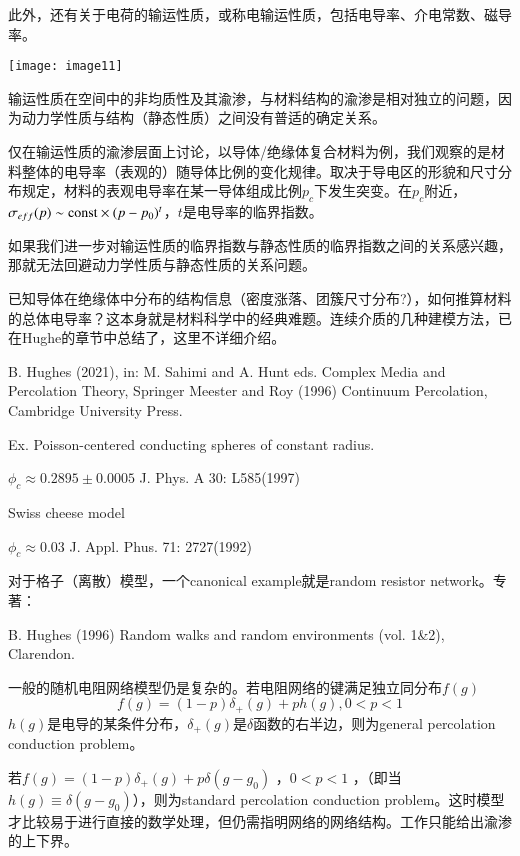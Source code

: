 \documentclass{article} %
\begin{document}
此外，还有关于电荷的输运性质，或称电输运性质，包括电导率、介电常数、磁导率。

\noindent \texttt{[image: image11]}

输运性质在空间中的非均质性及其渝渗，与材料结构的渝渗是相对独立的问题，因为动力学性质与结构（静态性质）之间没有普适的确定关系。

仅在输运性质的渝渗层面上讨论，以导体/绝缘体复合材料为例，我们观察的是材料整体的电导率（表观的）随导体比例的变化规律。取决于导电区的形貌和尺寸分布规定，材料的表观电导率在某一导体组成比例$p_{c} $下发生突变。在$p_{c} $附近，$\sigma _{eff} (p)\sim {\rm const}\times (p-p_{0} )^{t} $，$t$是电导率的临界指数。

如果我们进一步对输运性质的临界指数与静态性质的临界指数之间的关系感兴趣，那就无法回避动力学性质与静态性质的关系问题。

已知导体在绝缘体中分布的结构信息（密度涨落、团簇尺寸分布?），如何推算材料的总体电导率？这本身就是材料科学中的经典难题。连续介质的几种建模方法，已在Hughe的章节中总结了，这里不详细介绍。

\noindent B. Hughes (2021), in: M. Sahimi and A. Hunt eds. Complex Media and Percolation Theory, Springer Meester and Roy (1996) Continuum Percolation, Cambridge University Press.

\noindent Ex. Poisson-centered conducting spheres of constant radius.

\noindent $\phi _{c} \approx 0.2895\pm 0.0005$ J. Phys. A 30: L585(1997)

\noindent Swiss cheese model

\noindent $\phi _{c} \approx 0.03$ J. Appl. Phus. 71: 2727(1992)

\noindent 对于格子（离散）模型，一个canonical example就是random resistor network。专著：

\noindent B. Hughes (1996) Random walks and random environments (vol. 1\&2), Clarendon.

\noindent 一般的随机电阻网络模型仍是复杂的。若电阻网络的键满足独立同分布$f\left(g\right)$
\[f\left(g\right)=(1-p)\delta _{+} (g)+ph\left(g\right),0<p<1\] 
$h\left(g\right)$是电导的某条件分布，$\delta _{+} (g)$是$\delta $函数的右半边，则为general percolation conduction problem。

\noindent 若$f(g)=(1-p)\delta _{+} (g)+p\delta (g-g_{0} )$ ，$0<p<1$ ，（即当$h\left(g\right)\equiv \delta (g-g_{0} )$），则为standard percolation conduction problem。这时模型才比较易于进行直接的数学处理，但仍需指明网络的网络结构。工作只能给出渝渗的上下界。
\end{document}
